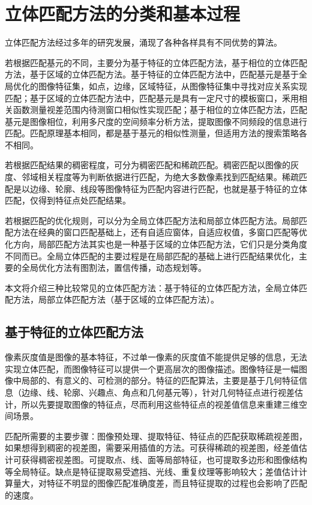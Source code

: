 \section{立体匹配方法的分类和基本过程}

立体匹配方法经过多年的研究发展，涌现了各种各样具有不同优势的算法。

若根据匹配基元的不同，主要分为基于特征的立体匹配方法，基于相位的立体匹配方法，基于区域的立体匹配方法。基于特征的立体匹配方法中，匹配基元是基于全局优化的图像特征集，如点，边缘，区域特征，从图像特征集中寻找对应关系实现匹配；基于区域的立体匹配方法中，匹配基元是具有一定尺寸的模板窗口，釆用相关函数测量视差范围内待测窗口相似性实现匹配；基于相位的立体匹配方法，匹配基元是图像相位，利用多尺度的空间频率分析方法，提取图像不同频段的信息进行匹配。匹配原理基本相同，都是基于基元的相似性测量，但适用方法的搜索策略各不相同。

若根据匹配结果的稠密程度，可分为稠密匹配和稀疏匹配。稠密匹配以图像的灰度、邻域相关程度等为判断依据进行匹配，为绝大多数像素找到匹配结果。稀疏匹配是以边缘、轮廓、线段等图像特征为匹配内容进行匹配，也就是基于特征的立体匹配，仅得到特征点处匹配结果。

若根据匹配的优化规则，可以分为全局立体匹配方法和局部立体匹配方法。局部匹配方法在经典的窗口匹配基础上，还有自适应窗体，自适应权值，多窗口匹配等优化方向，局部匹配方法其实也是一种基于区域的立体匹配方法，它们只是分类角度不同而已。全局立体匹配的主要过程是在局部匹配的基础上进行匹配结果优化，主要的全局优化方法有图割法，置信传播，动态规划等。


本文将介绍三种比较常见的立体匹配方法：基于特征的立体匹配方法，全局立体匹配方法，局部立体匹配方法（基于区域的立体匹配方法）。

\subsection{基于特征的立体匹配方法}
像素灰度值是图像的基本特征，不过单一像素的灰度值不能提供足够的信息，无法实现立体匹配，而图像特征可以提供一个更高层次的图像描述。图像特征是一幅图像中局部的、有意义的、可检测的部分。特征的匹配算法，主要是基于几何特征信息（边缘、线、轮廓、兴趣点、角点和几何基元等），针对几何特征点进行视差估计，所以先要提取图像的特征点，尽而利用这些特征点的视差值信息来重建三维空间场景。

匹配所需要的主要步骤：图像预处理、提取特征、特征点的匹配获取稀疏视差图，如果想得到稠密的视差图，需要采用插值的方法。可获得稀疏的视差图，经差值估计可获得稠密视差图。可提取点、线、面等局部特征，也可提取多边形和图像结构等全局特征。缺点是特征提取易受遮挡、光线、重复纹理等影响较大；差值估计计算量大，对特征不明显的图像匹配准确度差，而且特征提取的过程也会影响了匹配的速度。

